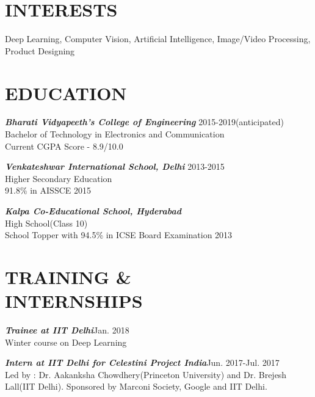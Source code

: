 \documentclass[margin, 10pt]{res} %
\begin{document}
\begin{resume}

 
\section{INTERESTS}  

Deep Learning, Computer Vision, Artificial Intelligence, Image/Video Processing, Product Designing

\section{EDUCATION} 
{\sl \bf{Bharati Vidyapeeth's College of Engineering}} \hfill 2015-2019(anticipated)\\ Bachelor of Technology in Electronics and Communication\\
Current CGPA Score - 8.9/10.0

{\sl \bf{Venkateshwar International School, Delhi}}
\hfill 2013-2015 \\Higher Secondary Education\\ 91.8\% in AISSCE 2015

{\sl \bf{Kalpa Co-Educational School, Hyderabad}}\\High School(Class 10)\\School Topper with 94.5\% in ICSE Board Examination 2013


\section{TRAINING \& \\ INTERNSHIPS}
{\sl \bf{Trainee at IIT Delhi}}\hfill Jan. 2018\\
Winter course on Deep Learning

{\sl \bf{Intern at IIT Delhi for Celestini Project India}}\hfill Jun. 2017-Jul. 2017\\
Led by : Dr. Aakanksha Chowdhery(Princeton University) and Dr. Brejesh Lall(IIT Delhi). Sponsored by Marconi Society, Google and IIT Delhi. 


\end{resume}
\end{document}
